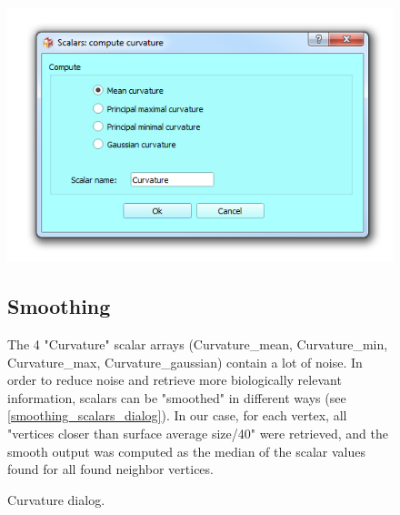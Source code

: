 \documentclass[12pt, a4paper]{book}
\begin{document}
\begin{figure}
  \centering
  \includegraphics[scale=0.5]{curvature_dialog.png} 
	\caption{Curvature dialog.}
\label{curvature_dialog}
 
\subsection{Smoothing}
The 4 "Curvature" scalar arrays (Curvature\_mean, Curvature\_min, Curvature\_max, Curvature\_gaussian) contain a lot of noise. In order to reduce noise and retrieve more biologically relevant information, scalars can be "smoothed" in different ways (see \ref{smoothing_scalars_dialog}). In our case, for each vertex, all "vertices closer than surface average size/40" were retrieved, and the smooth output was computed as the median of the scalar values found for all found neighbor vertices.


\end{figure}
\end{document}
